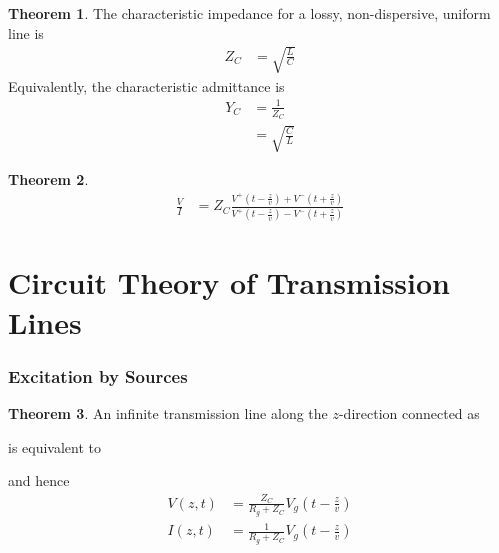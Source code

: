 \documentclass[titlepage, fleqn, a4paper, 12pt, twoside]{article}
\theoremstyle{definition}
\theoremstyle{theorem}
\newtheorem{theorem}{Theorem}
\begin{document}
\begin{theorem}
	The characteristic impedance for a lossy, non-dispersive, uniform line is
	\begin{align*}
		Z_C &= \sqrt{\frac{L}{C}}
	\end{align*}
	Equivalently, the characteristic admittance is
	\begin{align*}
		Y_C &= \frac{1}{Z_C}\\
		&= \sqrt{\frac{C}{L}}
	\end{align*}
\end{theorem}

\begin{theorem}
	\begin{align*}
		\frac{V}{I} &= Z_C \frac{V^+\left( t - \frac{z}{v} \right) + V^-\left( t + \frac{z}{v} \right)}{V^+\left( t - \frac{z}{v} \right) - V^-\left( t + \frac{z}{v} \right)}
	\end{align*}
\end{theorem}

\clearpage
\part{Circuit Theory of Transmission Lines}

\section{Excitation by Sources}

\begin{theorem}
	An infinite transmission line along the $z$-direction connected as
	\begin{figure}[H]
		\centering
	\end{figure}
	is equivalent to
	\begin{figure}[H]
		\centering
	\end{figure}
	and hence
	\begin{align*}
		V(z,t) &= \frac{Z_C}{R_g + Z_C} V_g \left( t - \frac{z}{v} \right)\\
		I(z,t) &= \frac{1}{R_g + Z_C} V_g \left( t - \frac{z}{v} \right)
	\end{align*}
\end{theorem}
\end{document}
